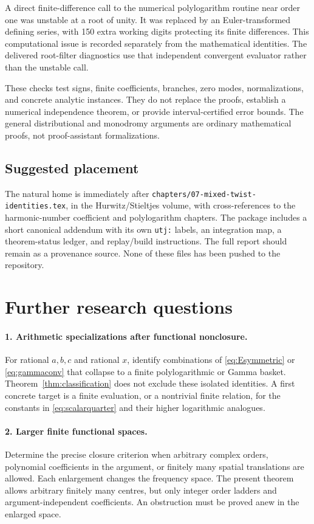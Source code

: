 \documentclass[11pt,a4paper]{article}
\numberwithin{equation}{section}
\theoremstyle{definition}\newtheorem{definition}[theorem]{Definition}
\theoremstyle{remark}\newtheorem{remark}[theorem]{Remark}
\newcommand{\pathref}[1]{\nolinkurl{#1}}
\begin{document}
A direct finite-difference call to the numerical polylogarithm routine
near order one was unstable at a root of unity. It was replaced by an
Euler-transformed defining series, with 150 extra working digits protecting
its finite differences. This computational issue is recorded separately
from the mathematical identities. The delivered root-filter diagnostics
use that independent convergent evaluator rather than the unstable call.

These checks test signs, finite coefficients, branches, zero modes,
normalizations, and concrete analytic instances. They do not replace
the proofs, establish a numerical independence theorem, or provide
interval-certified error bounds. The general distributional and
monodromy arguments are ordinary mathematical proofs, not
proof-assistant formalizations.

\subsection{Suggested placement}
The natural home is immediately after
\pathref{chapters/07-mixed-twist-identities.tex}, in the Hurwitz/Stieltjes
volume, with cross-references to the harmonic-number coefficient and
polylogarithm chapters. The package includes a short canonical addendum
with its own \texttt{utj:} labels, an integration map, a theorem-status
ledger, and replay/build instructions. The full report should remain as
a provenance source. None of these files has been pushed to the repository.

\section{Further research questions}
\label{sec:future}
\paragraph{1. Arithmetic specializations after functional nonclosure.}
For rational $a,b,c$ and rational $x$, identify combinations of
\eqref{eq:Esymmetric} or \eqref{eq:gammaconv} that collapse to a finite
polylogarithmic or Gamma basket. Theorem~\ref{thm:classification} does
not exclude these isolated identities. A first concrete target is a
finite evaluation, or a nontrivial finite relation, for the constants
in \eqref{eq:scalarquarter} and their higher logarithmic analogues.

\paragraph{2. Larger finite functional spaces.}
Determine the precise closure criterion when arbitrary complex orders,
polynomial coefficients in the argument, or finitely many spatial
translations are allowed. Each enlargement changes the frequency
space. The present theorem allows arbitrary finitely many centres,
but only integer order ladders and argument-independent coefficients.
An obstruction must be proved anew in the enlarged space.
\end{document}

